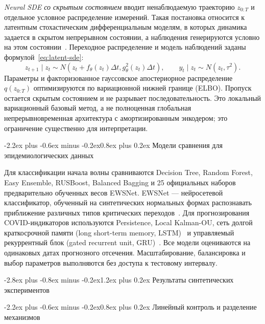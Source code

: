\documentclass[12pt,a4paper]{article}
\makeatletter
\numberwithin{table}{section}
\numberwithin{figure}{section}
\renewcommand\section{\@startsection{section}{1}{0pt}
  {-2.8ex plus -0.8ex minus -0.2ex}{1.2ex plus 0.2ex}
  {\centering\normalfont\normalsize\bfseries}}
\renewcommand\subsection{\@startsection{subsection}{2}{0pt}
  {-2.2ex plus -0.6ex minus -0.2ex}{0.8ex plus 0.2ex}
  {\normalfont\normalsize\bfseries}}
\newcommand{\term}[1]{\textit{#1}}
\makeatother
\begin{document}
\term{Neural SDE со скрытым состоянием} вводит ненаблюдаемую траекторию
$z_{0:T}$ и отдельное условное распределение измерений. Такая постановка
относится к латентным стохастическим дифференциальным моделям, в которых
динамика задается в скрытом непрерывном состоянии, а наблюдения генерируются
условно на этом состоянии~\cite{li2020}. Переходное распределение и модель
наблюдений заданы формулой~\eqref{eq:latent-sde}:
\begin{equation}
\tag{3.2}
\label{eq:latent-sde}
 z_{t+1}\mid z_t\sim N\!\left(z_t+f_\theta(z_t)\Delta t,
 g_\theta^2(z_t)\Delta t\right),\qquad
 y_t\mid z_t\sim N(z_t,\tau^2).
\end{equation}
Параметры и факторизованное гауссовское апостериорное распределение
$q(z_{0:T})$ оптимизируются по вариационной нижней границе (ELBO). Пропуск
остается скрытым состоянием и не разрывает последовательность. Это локальный
вариационный базовый метод, а не полноценная глобальная непрерывновременная
архитектура с амортизированным энкодером; это ограничение существенно для
интерпретации.

\subsection{Модели сравнения для эпидемиологических данных}

Для классификации начала волны сравниваются Decision Tree, Random Forest, Easy
Ensemble, RUSBoost, Balanced Bagging и 25 официальных наборов предварительно
обученных весов EWSNet. EWSNet --- нейросетевой классификатор, обученный на
синтетических нормальных формах распознавать приближение различных типов
критических переходов~\cite{bury2021}. Для прогнозирования COVID-индикаторов
используются Persistence, Local Kalman-OU, сеть долгой краткосрочной памяти
(long short-term memory, LSTM)~\cite{hochreiter1997} и управляемый рекуррентный
блок (gated recurrent unit, GRU)~\cite{cho2014}. Все модели оцениваются на
одинаковых датах прогнозного отсечения. Масштабирование, балансировка и выбор
параметров выполняются без доступа к тестовому интервалу.

\clearpage
\section{Результаты синтетических экспериментов}

\subsection{Линейный контроль и разделение механизмов}
\end{document}
